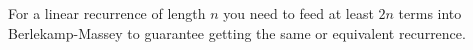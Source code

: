 For a linear recurrence of length $n$ you need to feed at least $2n$ terms into Berlekamp-Massey to guarantee getting the same or equivalent recurrence. \\